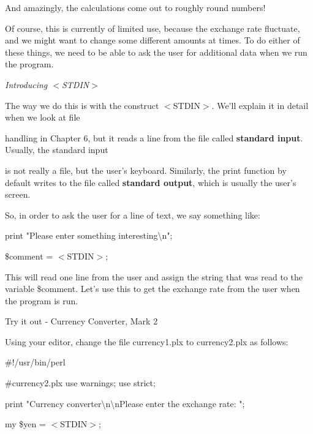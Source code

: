 \documentclass[a4paper,11pt]{book}
\begin{document}
\noindent 

\noindent And amazingly, the calculations come out to roughly round numbers!

\noindent 

\noindent Of course, this is currently of limited use, because the exchange rate fluctuate, and we might want to change some different amounts at times. To do either of these things, we need to be able to ask the user for additional data when we run the program.

\noindent 

\noindent \textit{Introducing $<$STDIN$>$}

\noindent The way we do this is with the construct $<$STDIN$>$. We'll explain it in detail when we look at file

\noindent handling in Chapter 6, but it reads a line from the file called \textbf{standard input}. Usually, the standard input

\noindent is not really a file, but the user's keyboard. Similarly, the print function by default writes to the file called \textbf{standard output}, which is usually the user's screen.

\noindent 

\noindent So, in order to ask the user for a line of text, we say something like:

\noindent 

\noindent print "Please enter something interesting\textbackslash n";

\noindent \$comment = $<$STDIN$>$;

\noindent 

\noindent This will read one line from the user and assign the string that was read to the variable \$comment. Let's use this to get the exchange rate from the user when the program is run.

\noindent 

\noindent Try it out - Currency Converter, Mark 2

\noindent 

\noindent Using your editor, change the file currency1.plx to currency2.plx as follows:

\noindent 

\noindent \#!/usr/bin/perl

\noindent \#currency2.plx use warnings; use strict;

\noindent print "Currency converter\textbackslash n\textbackslash nPlease enter the exchange rate: ";

\noindent my \$yen = $<$STDIN$>$;
\end{document}
